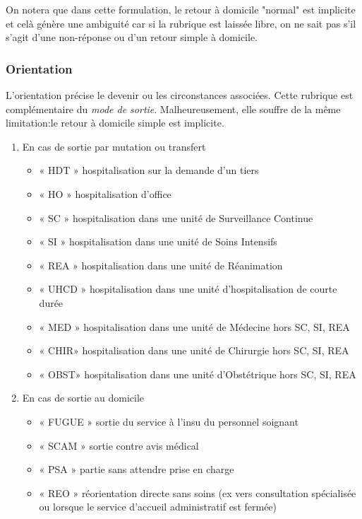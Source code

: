 \documentclass[12pt,english,french,twoside]{book}\usepackage[]{graphicx}\usepackage[]{color}
\begin{document}
On notera que dans cette formulation, le retour à domicile "normal" est implicite et celà génère une ambiguité car si la rubrique est laissée libre, on ne sait pas s'il s'agit d'une non-réponse ou d'un retour simple à domicile.

\subsubsection{Orientation}

L'orientation précise le devenir ou les circonstances associées. Cette rubrique est complémentaire du \emph{mode de sortie}. Malheureusement, elle souffre de la même limitation:le retour à domicile simple est implicite.

\begin{enumerate}
  \item En cas de sortie par mutation ou transfert
    \begin{itemize}
      \item « HDT » hospitalisation sur la demande d’un tiers
      \item « HO » hospitalisation d’office
      \item « SC » hospitalisation dans une unité de Surveillance Continue
      \item « SI » hospitalisation dans une unité de Soins Intensifs
      \item « REA » hospitalisation dans une unité de Réanimation
      \item « UHCD » hospitalisation dans une unité d’hospitalisation de courte durée
      \item « MED » hospitalisation dans une unité de Médecine hors SC, SI, REA
      \item « CHIR» hospitalisation dans une unité de Chirurgie hors SC, SI, REA
      \item « OBST» hospitalisation dans une unité d’Obstétrique hors SC, SI, REA
    \end{itemize}

  \item En cas de sortie au domicile
    \begin{itemize}
      \item « FUGUE » sortie du service à l’insu du personnel soignant
      \item « SCAM » sortie contre avis médical
      \item « PSA » partie sans attendre prise en charge
      \item « REO » réorientation directe sans soins (ex vers consultation spécialisée ou   lorsque le service d’accueil administratif est fermée)
    \end{itemize}

\end{enumerate}
\end{document}
